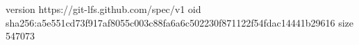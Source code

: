 version https://git-lfs.github.com/spec/v1
oid sha256:a5e551cd73f917af8055c003c88fa6a6c502230f871122f54fdac14441b29616
size 547073
